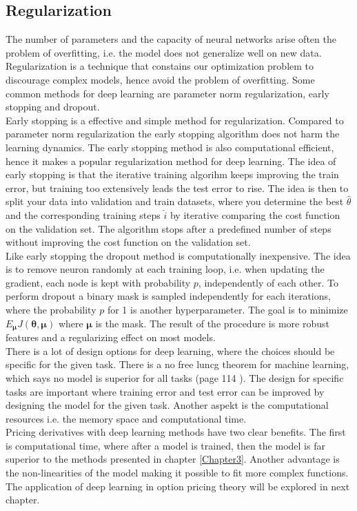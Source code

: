 \subsection{Regularization}\label{regularization}
The number of parameters and the capacity of neural networks arise often the problem of overfitting, i.e. the model does not generalize well on new data. Regularization is a technique that constains our optimization problem to discourage complex models, hence avoid the problem of overfitting. Some common methods for deep learning are parameter norm regularization, early stopping and dropout.\\

Early stopping is a effective and simple method for regularization. Compared to parameter norm regularization the early stopping algorithm does not harm the learning dynamics. The early stopping method is also computational efficient, hence it makes a popular regularization method for deep learning. The idea of early stopping is that the iterative training algorihm keeps improving the train error, but training too extensively leads the test error to rise. The idea is then to split your data into validation and train datasets, where you determine the best $\hat{\theta}$ and the corresponding training steps $\hat{i}$ by iterative comparing the cost function on the validation set. The algorithm stops after a predefined number of steps without improving the cost function on the validation set.\\

Like early stopping the dropout method is computationally inexpensive. The idea is to remove neuron randomly at each training loop, i.e. when updating the gradient, each node is kept with probability $p$, independently of each other. To perform dropout a binary mask is sampled independently for each iterations, where the probability $p$ for 1 is another hyperparameter. The goal is to minimize $E_{\bm{\mu}} J(\bm{\theta}, \bm{\mu})$ where $\bm{\mu}$ is the mask. The result of the procedure is more robust features and a regularizing effect on most models.\\

There is a lot of design options for deep learning, where the choices should be specific for the given task. There is a no free luncg theorem for machine learning, which says no model is superior for all tasks (page 114 \parencite{Goodfellow-et-al-2016}). The design for specific tasks are important where training error and test error can be improved by designing the model for the given task. Another aspekt is the computational resources i.e. the memory space and computational time. \\

Pricing derivatives with deep learning methods have two clear benefits. The first is computational time, where after a model is trained, then the model is far superior to the methods presented in chapter \ref{Chapter3}. Another advantage is the non-linearities of the model making it possible to fit more complex functions. The application of deep learning in option pricing theory will be explored in next chapter.
